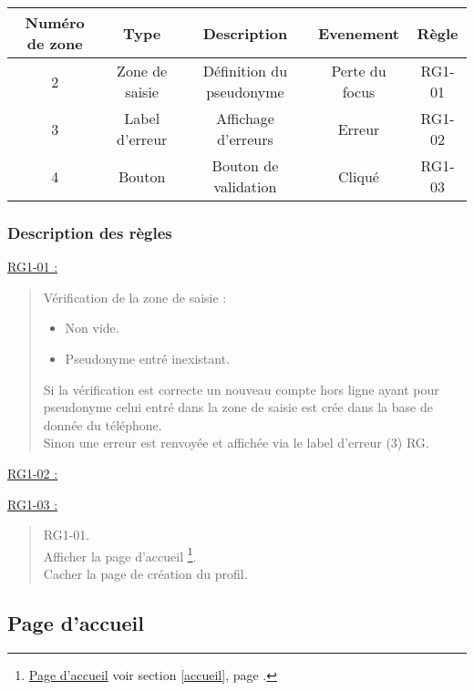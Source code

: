 \documentclass{report}
\begin{document}
			\begin{tabular}{|c|c|c|c|c|} \hline
				Numéro de zone & Type  & Description & Evenement &	Règle \\\hline 
				2 & Zone de saisie & Définition du pseudonyme & Perte du focus & RG1-01 \\\hline
				3 & Label d'erreur & Affichage d'erreurs      & Erreur         & RG1-02
				\\\hline 4 & Bouton         & Bouton de validation     & Cliqué & RG1-03 \\\hline
			\end{tabular}

		\subsubsection{Description des règles}
		
		\underline{RG1-01 :}
			\begin{quote}
				Vérification de la zone de saisie :
				\begin{itemize}
				  \item Non vide.
				  \item Pseudonyme entré inexistant.
				\end{itemize}
				Si la vérification est correcte un nouveau compte hors ligne ayant pour
				pseudonyme celui entré dans la zone de saisie est crée dans la base de donnée
				du téléphone.\\
				Sinon une erreur est renvoyée et affichée via le label d'erreur (3) RG.
			\end{quote}
			
		\underline{RG1-02 :}
			\begin{quote}
			
			\end{quote}		

		\underline{RG1-03 :}
			\begin{quote}
				RG1-01.\\
				Afficher la page d'accueil%
					\footnote[1]{
						\hyperlink{Page d'accueil}{Page d'accueil}
						\og voir section \ref{accueil}, page \pageref{accueil}.\fg
					}.\\
				Cacher la page de création du profil.
			\end{quote}
	
\newpage

	\subsection{Page d'accueil}
		\hypertarget{Page d'accueil}{}
		\label{accueil}
	
\end{document}
